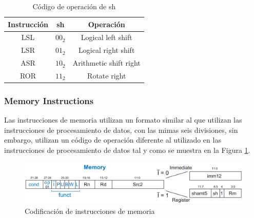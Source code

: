 \documentclass[journal,trans]{IEEEtran}
\begin{document}
	\begin{table}[htbp]
		\centering
		\begin{tabular}{|c|c|c|}
			\hline
			Instrucción & sh       & Operación \\
			\hline
			\hline
			LSL         & $00_{2}$ & Logical left shift \\
			\hline
			LSR         & $01_{2}$ & Logical right shift \\
			\hline
			ASR         & $10_{2}$ & Arithmetic shift right \\
			\hline
			ROR         & $11_{2}$ & Rotate right \\
			\hline
		\end{tabular}
		\caption{Código de operación de sh}
		\label{tab:sh}
	\end{table}
	
	\subsubsection{Memory Instructions}
	Las instrucciones de memoria utilizan un formato similar al que utilizan las instrucciones de procesamiento de datos, con las mimas seis divisiones, sin embargo, utilizan un código de operación diferente al utilizado en las instrucciones de procesamiento de datos tal y como se muestra en la Figura \ref{fig:MemoryP}.
	
	\begin{figure}[htbp]
		\centering
		\includegraphics[width=\linewidth]{img/mempro.png}
		\caption{Codificación de instrucciones de memoria \cite{SarahLHarris2010}}
		\label{fig:MemoryP}
	\end{figure}
	
\end{document}
